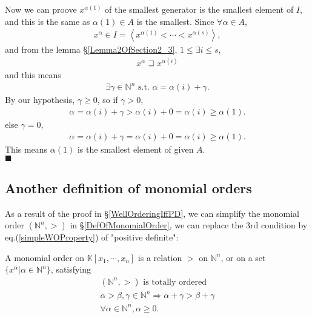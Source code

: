 \documentclass[11pt]{book}
\begin{document}
Now we can proove $x^{\alpha(1)}$ of the smallest generator is the smallest element of $I$, and this is the same as $\alpha(1) \in A$ is the smallest.
Since $\forall \alpha \in A$,
\begin{eqnarray}
x^\alpha \in I = \left< x^{\alpha(1)} < \cdots< x^{\alpha(s)} \right>,
\end{eqnarray}
and from the lemma \S\ref{Lemma2OfSection2_3}, $1 \leq \exists i \leq s$,
\begin{eqnarray}
x^\alpha \sqsupseteq x^{\alpha(i)}
\end{eqnarray}
and this means
\begin{eqnarray}
\exists \gamma \in \mathbb{N}^n \text{ s.t. } \alpha = \alpha(i) + \gamma.
\end{eqnarray}
By our hypothesis, $\gamma \geq 0$, so if $\gamma > 0$,
\begin{eqnarray}
\alpha = \alpha(i) + \gamma > \alpha(i) + 0 =  \alpha(i) \geq \alpha(1).
\end{eqnarray}
else $\gamma = 0$,
\begin{eqnarray}
\alpha = \alpha(i) + \gamma = \alpha(i) + 0 =  \alpha(i) \geq \alpha(1).
\end{eqnarray}
This means $\alpha(1)$ is the smallest element of given $A$.\\
$\blacksquare$

\subsection{Another definition of monomial orders}
As a result of the proof in \S\ref{WellOrderingIffPD}, we can simplify the monomial order $(\mathbb{N}^n, >)$ in \S\ref{DefOfMonomialOrder}, we can replace the 3rd condition by eq.(\ref{simpleWOProperty}) of "positive definite":

A monomial order on $\mathbb{K}[x_1, \cdots, x_n]$ is a relation $>$ on $\mathbb{N}^n$, or on a set $\{x^\alpha | \alpha \in \mathbb{N}^n \}$, satisfying
\begin{eqnarray}
\text{$(\mathbb{N}^n, >)$ is totally ordered} \\
\alpha > \beta, \gamma \in \mathbb{N}^n \Rightarrow \alpha + \gamma > \beta + \gamma \\
\forall \alpha \in \mathbb{N}^n, \alpha \geq 0.
\end{eqnarray}



\end{document}
